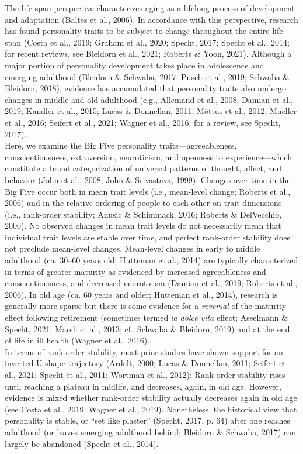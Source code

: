 \documentclass[
  english,
  man, noextraspace]{apa7}
\begin{document}
The life span perspective characterizes aging as a lifelong process of development and adaptation (Baltes et al., 2006). In accordance with this perspective, research has found personality traits to be subject to change throughout the entire life span (Costa et al., 2019; Graham et al., 2020; Specht, 2017; Specht et al., 2014; for recent reviews, see Bleidorn et al., 2021; Roberts \& Yoon, 2021). Although a major portion of personality development takes place in adolescence and emerging adulthood (Bleidorn \& Schwaba, 2017; Pusch et al., 2019; Schwaba \& Bleidorn, 2018), evidence has accumulated that personality traits also undergo changes in middle and old adulthood (e.g., Allemand et al., 2008; Damian et al., 2019; Kandler et al., 2015; Lucas \& Donnellan, 2011; Mõttus et al., 2012; Mueller et al., 2016; Seifert et al., 2021; Wagner et al., 2016; for a review, see Specht, 2017).\\
Here, we examine the Big Five personality traits---agreeableness, conscientiousness, extraversion, neuroticism, and openness to experience---which constitute a broad categorization of universal patterns of thought, affect, and behavior (John et al., 2008; John \& Srivastava, 1999). Changes over time in the Big Five occur both in mean trait levels (i.e., mean-level change; Roberts et al., 2006) and in the relative ordering of people to each other on trait dimensions (i.e., rank-order stability; Anusic \& Schimmack, 2016; Roberts \& DelVecchio, 2000). No observed changes in mean trait levels do not necessarily mean that individual trait levels are stable over time, and perfect rank-order stability does not preclude mean-level changes. Mean-level changes in early to middle adulthood (ca. 30--60 years old; Hutteman et al., 2014) are typically characterized in terms of greater maturity as evidenced by increased agreeableness and conscientiousness, and decreased neuroticism (Damian et al., 2019; Roberts et al., 2006). In old age (ca. 60 years and older; Hutteman et al., 2014), research is generally more sparse but there is some evidence for a \emph{reversal} of the maturity effect following retirement (sometimes termed \emph{la dolce vita} effect; Asselmann \& Specht, 2021; Marsh et al., 2013; cf.~Schwaba \& Bleidorn, 2019) and at the end of life in ill health (Wagner et al., 2016).\\
In terms of rank-order stability, most prior studies have shown support for an inverted U-shape trajectory (Ardelt, 2000; Lucas \& Donnellan, 2011; Seifert et al., 2021; Specht et al., 2011; Wortman et al., 2012): Rank-order stability rises until reaching a plateau in midlife, and decreases, again, in old age. However, evidence is mixed whether rank-order stability actually decreases again in old age (see Costa et al., 2019; Wagner et al., 2019). Nonetheless, the historical view that personality is stable, or \enquote{set like plaster} (Specht, 2017, p. 64) after one reaches adulthood (or leaves emerging adulthood behind; Bleidorn \& Schwaba, 2017) can largely be abandoned (Specht et al., 2014).\\
\end{document}
